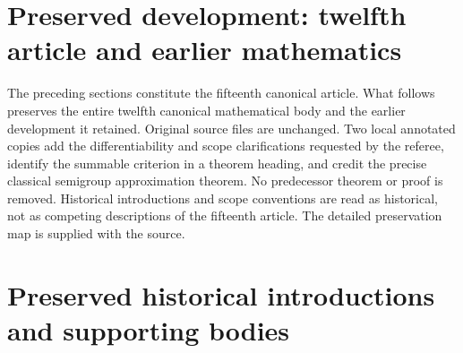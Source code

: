 \newif\ifcomplete\completetrue


\clearpage
\section*{Preserved development: twelfth article and earlier mathematics}
The preceding sections constitute the fifteenth canonical article.
What follows preserves the entire twelfth canonical mathematical body
and the earlier development it retained. Original source files are
unchanged. Two local annotated copies add the differentiability and
scope clarifications requested by the referee, identify the summable
criterion in a theorem heading, and credit the precise classical
semigroup approximation theorem. No predecessor theorem or proof is
removed. Historical introductions and scope conventions are read as
historical, not as competing descriptions of the fifteenth article.
The detailed preservation map is supplied with the source.

\clearpage
\section*{Preserved historical introductions and supporting bodies}

























